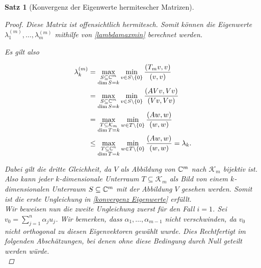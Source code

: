 \documentclass{article}
\theoremstyle{plain}
\newtheorem{theorem}    {Satz}   [section]
\begin{document}
\begin{theorem}[Konvergenz der Eigenwerte hermitescher Matrizen]
\begin{proof}
	Diese Matrix ist offensichtlich hermitesch. Somit können die Eigenwerte $\lambda_1^{(m)}, \dots, \lambda_m^{(m)}$ mithilfe von \eqref{lambdamaxmin} berechnet werden.

	Es gilt also

	\begin{equation}
		\label{Eigenwert_Ungl}
		\begin{aligned}
			\lambda_k^{(m)} &= \max_{\substack{S \subseteq \mathbb{C}^m\\ \dim S = k}} \min_{v\in S\setminus\{0\}} \frac{(T_m v,v)}{(v,v)} \\
			&= \max_{\substack{S \subseteq \mathbb{C}^m\\ \dim S = k}} \min_{v\in S\setminus\{0\}} \frac{(AVv,Vv)}{(Vv,Vv)}\\
			&= \max_{\substack{T \subseteq \mathcal{K}_m \\ \dim T = k}} \min_{w\in T\setminus\{0\}} \frac{(Aw,w)}{(w,w)}\\
			 &\le \max_{\substack{T \subseteq \mathbb{C}^n\\ \dim T = k}} \min_{w\in T\setminus\{0\}} \frac{(Aw,w)}{(w,w)} = \lambda_k.
		\end{aligned}
	\end{equation}

	Dabei gilt die dritte Gleichheit, da $V$ als Abbildung von $\mathbb{C}^m$ nach $\mathcal{K}_m$ bijektiv ist. Also kann jeder $k$-dimensionale Unterraum $T \subseteq \mathcal{K}_m$ als Bild von einem $k$-dimensionalen Unterraum $S \subseteq \mathbb{C}^m$ mit der Abbildung $V$ gesehen werden.
	Somit ist die erste Ungleichung in \eqref{konvergenz Eigenwerte} erfüllt.\\

	Wir beweisen nun die zweite Ungleichung zuerst für den Fall $i = 1$.
	Sei $v_0 = \sum_{j=1}^{n}\alpha_j u_j$. Wir bemerken, dass $\alpha_1, \dots, \alpha_{m-1}$ nicht verschwinden, da $v_0$ nicht orthogonal zu diesen Eigenvektoren gewählt wurde. Dies Rechtfertigt im folgenden Abschätzungen, bei denen ohne diese Bedingung durch Null geteilt werden würde.\\


\end{proof}
\end{theorem}
\end{document}
